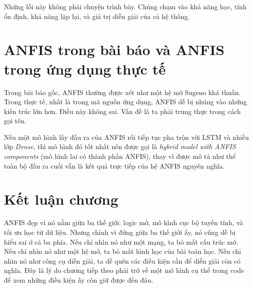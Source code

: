 Những lỗi này không phải chuyện trình bày. Chúng chạm vào khả năng học, tính ổn định, khả năng lặp lại, và giá trị diễn giải của cả hệ thống.

\section{ANFIS trong bài báo và ANFIS trong ứng dụng thực tế}

Trong bài báo gốc, ANFIS thường được xét như một hệ mờ Sugeno khá thuần. Trong thực tế, nhất là trong mã nguồn ứng dụng, ANFIS dễ bị nhúng vào những kiến trúc lớn hơn. Điều này không sai. Vấn đề là ta phải trung thực trong cách gọi tên.

Nếu một mô hình lấy đầu ra của ANFIS rồi tiếp tục pha trộn với LSTM và nhiều lớp \emph{Dense}, thì mô hình đó tốt nhất nên được gọi là \emph{hybrid model with ANFIS components} (mô hình lai có thành phần ANFIS), thay vì được mô tả như thể toàn bộ đầu ra cuối vẫn là kết quả trực tiếp của hệ ANFIS nguyên nghĩa.

\section{Kết luận chương}

ANFIS đẹp vì nó nằm giữa ba thế giới: logic mờ, mô hình cục bộ tuyến tính, và tối ưu học từ dữ liệu. Nhưng chính vì đứng giữa ba thế giới ấy, nó cũng dễ bị hiểu sai ở cả ba phía. Nếu chỉ nhìn nó như một mạng, ta bỏ mất cấu trúc mờ. Nếu chỉ nhìn nó như một hệ mờ, ta bỏ mất hình học của bài toán học. Nếu chỉ nhìn nó như công cụ diễn giải, ta dễ quên các điều kiện cần để diễn giải còn có nghĩa. Đây là lý do chương tiếp theo phải trở về một mô hình cụ thể trong code để xem những điều kiện ấy còn giữ được đến đâu.
